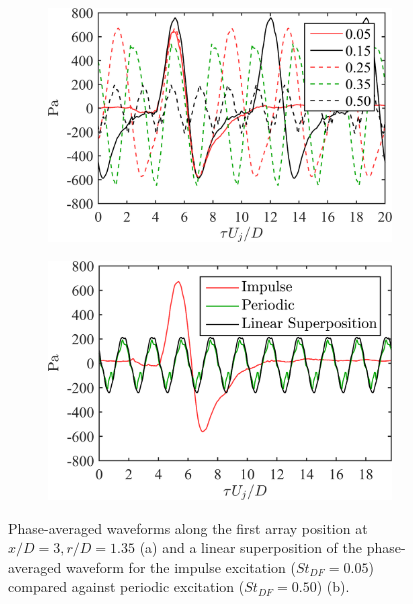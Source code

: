 \begin{figure}
	\centering
	\begin{subfigure}{.5\textwidth}
		\centering
		\includegraphics[width=0.95\linewidth]{Figures/ch3_nearfield_phavg_v2.png}
		\caption{}
		\label{fig:ch3_nearfield_phavg}
	\end{subfigure}%
	\begin{subfigure}{.5\textwidth}
		\centering
		\includegraphics[width=0.95\linewidth]{Figures/ch3_nearfield_linear_v2.png}
		\caption{}
		\label{fig:ch3_nearfield_linear}
	\end{subfigure}
	\caption{Phase-averaged waveforms along the first array position at $x/D = 3, r/D = 1.35$ (a) and a linear superposition of the phase-averaged waveform for the impulse excitation ($St_{DF} = 0.05$) compared against periodic excitation ($St_{DF} = 0.50$) (b).}
	\label{fig:ch3_nearfield}
\end{figure}


